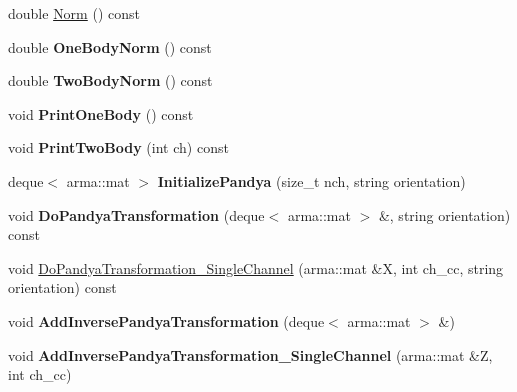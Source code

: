 \begin{DoxyCompactItemize}
\item 
double \hyperlink{classOperator_acb9d7959232a636191b91f6bf5b7b0c8}{Norm} () const 
\item 
double {\bfseries One\+Body\+Norm} () const \hypertarget{classOperator_a72dc7aea85c7775097d235de6f17f330}{}\label{classOperator_a72dc7aea85c7775097d235de6f17f330}

\item 
double {\bfseries Two\+Body\+Norm} () const \hypertarget{classOperator_af1c40bdef64ec9abd5d95e8328565a67}{}\label{classOperator_af1c40bdef64ec9abd5d95e8328565a67}

\item 
void {\bfseries Print\+One\+Body} () const \hypertarget{classOperator_a5ec5a8110337108ac31d3af7337e454b}{}\label{classOperator_a5ec5a8110337108ac31d3af7337e454b}

\item 
void {\bfseries Print\+Two\+Body} (int ch) const \hypertarget{classOperator_a905e42cefafaca0eb155cf41b3cd37b8}{}\label{classOperator_a905e42cefafaca0eb155cf41b3cd37b8}

\item 
deque$<$ arma\+::mat $>$ {\bfseries Initialize\+Pandya} (size\+\_\+t nch, string orientation)\hypertarget{classOperator_a26dab6abce8b9b8cad7d1c547d2ab396}{}\label{classOperator_a26dab6abce8b9b8cad7d1c547d2ab396}

\item 
void {\bfseries Do\+Pandya\+Transformation} (deque$<$ arma\+::mat $>$ \&, string orientation) const \hypertarget{classOperator_a90d693efa9c2a0c0a76d0c8f2fd424e5}{}\label{classOperator_a90d693efa9c2a0c0a76d0c8f2fd424e5}

\item 
void \hyperlink{classOperator_a40ea778ddd4c26666bdc15c463101d30}{Do\+Pandya\+Transformation\+\_\+\+Single\+Channel} (arma\+::mat \&X, int ch\+\_\+cc, string orientation) const 
\item 
void {\bfseries Add\+Inverse\+Pandya\+Transformation} (deque$<$ arma\+::mat $>$ \&)\hypertarget{classOperator_a27e3d0a110aa1c48575a9b3960ff9c50}{}\label{classOperator_a27e3d0a110aa1c48575a9b3960ff9c50}

\item 
void {\bfseries Add\+Inverse\+Pandya\+Transformation\+\_\+\+Single\+Channel} (arma\+::mat \&Z, int ch\+\_\+cc)\hypertarget{classOperator_a43d04939bd982e2a4323044dfe24023a}{}\label{classOperator_a43d04939bd982e2a4323044dfe24023a}


\end{DoxyCompactItemize}
